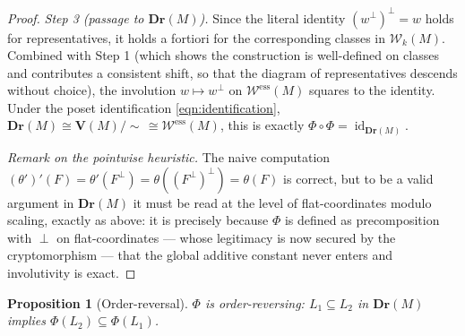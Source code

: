 \documentclass{article}
\newtheorem{proposition}[theorem]{Proposition}
\theoremstyle{definition}
\newcommand{\Dr}{\mathbf{Dr}}
\newcommand{\bV}{\mathbf V}
\newcommand{\cW}{\mathcal{W}}
\begin{document}
\begin{proof}
\smallskip
\noindent\emph{Step 3 (passage to $\Dr(M)$).}
Since the literal identity $(w^{\perp})^{\perp}=w$ holds for representatives, it holds a fortiori for
the corresponding classes in $\cW_k(M)$. Combined with Step 1 (which shows the construction is
well-defined on classes and contributes a consistent shift, so that the diagram of representatives
descends without choice), the involution $w\mapsto w^{\perp}$ on $\cW^{\mathrm{ess}}(M)$ squares to
the identity. Under the poset identification \eqref{eqn:identification},
$\Dr(M)\cong\bV(M)/\!\sim\,\cong\cW^{\mathrm{ess}}(M)$, this is exactly
$\Phi\circ\Phi=\operatorname{id}_{\Dr(M)}$.

\smallskip
\noindent\emph{Remark on the pointwise heuristic.} The naive computation
$(\theta')'(F)=\theta'(F^{\perp})=\theta((F^{\perp})^{\perp})=\theta(F)$ is correct, but to be a
valid argument in $\Dr(M)$ it must be read at the level of flat-coordinates modulo scaling, exactly
as above: it is precisely because $\Phi$ is defined as precomposition with $\perp$ on
flat-coordinates --- whose legitimacy is now secured by the cryptomorphism
 --- that the global additive constant never enters and involutivity
is exact.
\end{proof}

\begin{proposition}[Order-reversal]\label{prop:rev}
$\Phi$ is order-reversing: $L_1\subseteq L_2$ in $\Dr(M)$ implies $\Phi(L_2)\subseteq\Phi(L_1)$.
\end{proposition}
\end{document}
